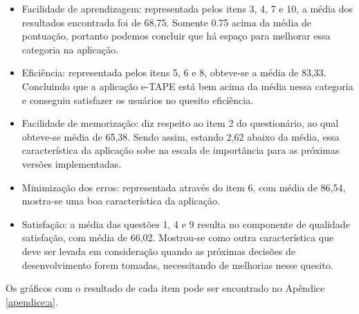 \begin{itemize}
    \item Facilidade de aprendizagem: representada pelos itens 3, 4, 7 e 10, a média dos resultados encontrada foi de 68,75. Somente 0.75 acima da média de pontuação, portanto podemos concluir que há espaço para melhorar essa categoria na aplicação.
    \item Eficiência: representada pelos itens 5, 6 e 8, obteve-se a média de 83,33. Concluindo que a aplicação e-TAPE está bem acima da média nessa categoria e conseguiu satisfazer os usuários no quesito eficiência.
    \item Facilidade de memorização: diz respeito ao item 2 do questionário, ao qual obteve-se média de 65,38. Sendo assim, estando 2,62 abaixo da média, essa característica da aplicação sobe na escala de importância para as próximas versões implementadas.
    \item Minimização dos erros: representada através do item 6, com média de 86,54, mostra-se uma boa característica da aplicação.
    \item Satisfação: a média das questões 1, 4 e 9 resulta no componente de qualidade satisfação, com média de 66,02. Mostrou-se como outra característica que deve ser levada em consideração quando as próximas decisões de desenvolvimento forem tomadas, necessitando de melhorias nesse quesito.
\end{itemize}

\par
Os gráficos com o resultado de cada item pode ser encontrado no Apêndice \ref{apendice:a}.


